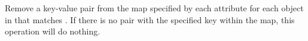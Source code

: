 Remove a key-value pair from the map specified by each attribute for each object
in  that matches .  If there is no pair with the
specified key within the map, this operation will do nothing.


